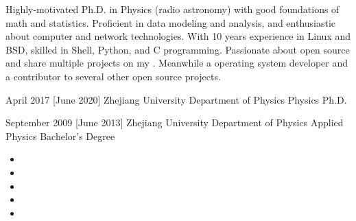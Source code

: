 \documentclass{resume}
\begin{document}
\makeheader

Highly-motivated Ph.D. in Physics (radio astronomy)
with good foundations of math and statistics.
Proficient in data modeling and analysis,
and enthusiastic about computer and network technologies.
With 10 years experience in Linux and BSD,
skilled in Shell, Python, and C programming.
Passionate about open source and share multiple projects on my
.
Meanwhile a 
operating system developer and a contributor to several other
open source projects.

\begin{competences}[10em]
\end{competences}

\begin{educations}
  \education%
    {April 2017}%
    [June 2020]%
    {Zhejiang University}%
    {Department of Physics}%
    {Physics}%
    {Ph.D.}

  \separator{0.5ex}
  \education%
    {September 2009}%
    [June 2013]%
    {Zhejiang University}%
    {Department of Physics}%
    {Applied Physics}%
    {Bachelor's Degree}
\end{educations}

\begin{itemize}
  \item 
  \item 
  \item 
  \item 
  \item 
\end{itemize}
\end{document}
